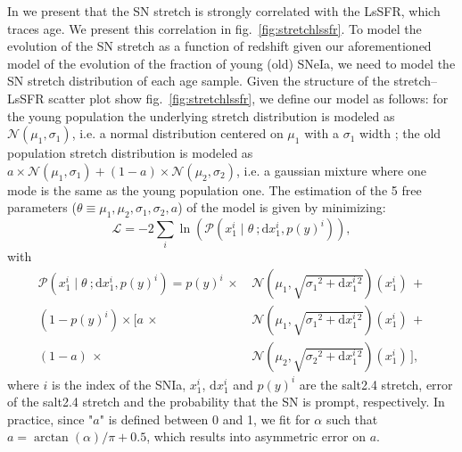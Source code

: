 \documentclass[]{aa} %
\newcommand{\prob}[2]{\mathcal{P}\left( #1 \mid #2\right)}
\begin{document}
In \cite{rigault2018} we present that the SN stretch is strongly correlated with
the LsSFR, which traces age. We present this correlation in
fig.~\ref{fig:stretchlssfr}. To model the evolution of the SN stretch as a
function of redshift given our aforementioned model of the evolution of the
fraction of young (old) SNeIa, we need to model the SN stretch distribution of
each age sample. Given the structure of the stretch--LsSFR scatter plot show
fig.~\ref{fig:stretchlssfr}, we define our model as follows: for the young
population the underlying stretch distribution is modeled as $\mathcal{N}(\mu_1,
\sigma_1)$, i.e. a normal distribution centered on $\mu_1$ with a $\sigma_1$
width ; the old population stretch distribution is  modeled as $a\times
\mathcal{N}(\mu_1, \sigma_1) + (1-a)\times \mathcal{N}(\mu_2, \sigma_2)$, i.e. a
gaussian mixture where one mode is the same as the young population one.  The
estimation of the 5 free parameters
($\theta\equiv{\mu_1,\mu_2,\sigma_1,\sigma_2,a}$) of the model is given by
minimizing:
\begin{equation}
    \label{eq:likelihood}
    \mathcal{L} = -2 \sum_i \ln\left( \prob{x^{i}_{1}}{\theta\ ;
                     \mathrm{d}x^{i}_{1}, p(y)^{i}}\right),
\end{equation}
with
\begin{align}
    \label{eq:likelihoodsnf}
    \prob{x^{i}_{1}}{ \theta\ ; \mathrm{d}x^{i}_{1}, p(y)^{i}} = 
    p(y)^{i}\,\times\,&\mathcal{N}\left(\mu_1, \sqrt{\sigma_1{}^{2}
    +\mathrm{d}x^{i}_{1}{}^{2}}\right)(x^{i}_{1})\,+\nonumber\\
    (1-p(y)^{i}) \times [a\,\times\,& \mathcal{N}\left(\mu_1,
    \sqrt{\sigma_1{}^{2}+\mathrm{d}x^{i}_{1}{}^{2}}\right)(x^{i}_{1})\,
    + \nonumber\\
    (1-a)\,\times\,&\mathcal{N}\left(\mu_2, \sqrt{\sigma_2{}^{2}
    +\mathrm{d}x^{i}_{1}{}^{2}}\right)(x^{i}_{1})\,],
\end{align}
where $i$ is the index of the SNIa, $x^{i}_{1}$, $\mathrm{d}x^{i}_{1}$ and
$p(y)^{i}$ are the salt2.4 stretch, error of the salt2.4 stretch and the
probability that the SN is prompt, respectively.  In practice, since "$a$" is
defined between 0 and 1, we fit for $\alpha$ such that
$a=\arctan(\alpha)/\pi+0.5$, which results into asymmetric error on $a$.
\end{document}
